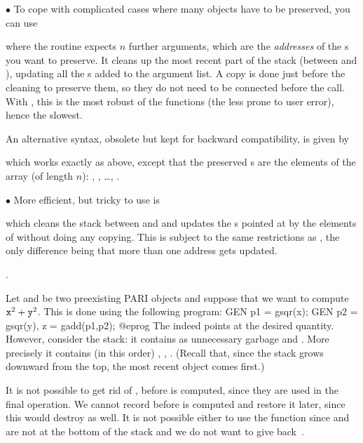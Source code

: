 \noindent$\bullet$
To cope with complicated cases where many objects have to be
preserved, you can use


\noindent where the routine expects $n$ further arguments, which are the
\emph{addresses} of the s you want to preserve. It cleans up the most
recent part of the stack (between  and ), updating all
the s added to the argument list. A copy is done just before the
cleaning to preserve them, so they do not need to be connected before the
call. With , this is the most robust of the 
functions (the less prone to user error), hence the slowest.

An alternative syntax, obsolete but kept for backward compatibility, is
given by


\noindent which works exactly as above, except that the preserved s
are the elements of the array  (of length $n$): ,
, \dots, .

\noindent$\bullet$ More efficient, but tricky to use is


\noindent which cleans the stack between  and  and
updates the s pointed at by the elements of  without doing
any copying. This is subject to the same restrictions as , the
only difference being that more than one address gets updated.

.


Let  and  be two preexisting PARI objects and suppose that we
want to compute ${\tt x}^2 + {\tt y}^2$. This is done using the following
program:
\bprog
  GEN p1 = gsqr(x);
  GEN p2 = gsqr(y), z = gadd(p1,p2);
@eprog\noindent
The   indeed points at the desired quantity. However,
consider the stack: it contains as unnecessary garbage  and .
More precisely it contains (in this order) , , .
(Recall that, since the stack grows downward from the top, the most recent
object comes first.)

It is not possible to get rid of ,  before  is
computed, since they are used in the final operation. We cannot record
 before  is computed and restore it later, since this would
destroy  as well. It is not possible either to use the function
 since  and  are not at the bottom of the stack and
we do not want to give back~.

